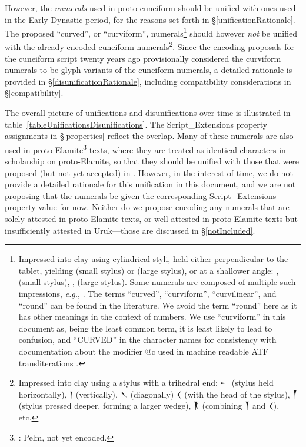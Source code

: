 \documentclass[10pt, a4paper, twoside]{article}
\newcommand\oneAšC{{\proposalfont\symbol{"12550}}} %
\newcommand\oneDišC{{\proposalfont\symbol{"12559}}}
\newcommand\oneUC{{\proposalfont\symbol{"12562}}}
\newcommand\oneŊešTwoC{{\proposalfont\symbol{"1256B}}}
\newcommand\oneŊešʾuC{{\proposalfont\symbol{"12574}}}
\newcommand\oneŠarTwoC{{\proposalfont\symbol{"12579}}}
\newcommand\oneŠarʾuC{{\proposalfont\symbol{"12582}}}
\newcommand\oneNThirtyNineA{{\proposalfont\symbol{"125B6}}}
\newcommand{\exempligratia}{\emph{e.g.}}
\begin{document}
However, the \emph{numerals} used in proto-cuneiform should be unified with
ones used in the Early Dynastic period, for the reasons set forth in
§\ref{unificationRationale}.
The proposed ``curved'', or ``curviform'', numerals\footnote{%
Impressed into clay using cylindrical styli,
held either perpendicular to the tablet, yielding
\oneUC{} (small stylus) or
\oneŠarTwoC{} (large stylus),
or at a shallower angle:
\oneAšC, \oneDišC{} (small stylus),
\oneŊešTwoC{}, \oneNThirtyNineA{} (large stylus).
Some numerals are composed of multiple such impressions,
\exempligratia, \oneŊešʾuC.
The terms ``curved'', ``curviform'', ``curvilinear'', and ``round''
can be found in the literature.
We avoid the term ``round'' here as it has other meanings
in the context of numbers.
We use ``curviform'' in this document as, being the least
common term, it is least likely to lead to confusion,
and ``CURVED'' in the character names for consistency
with documentation about the modifier @c used in machine
readable ATF transliterations \cite{inlineATF}.}
should however \emph{not} be unified with
the already-encoded cuneiform numerals\footnote{%
Impressed into clay using a stylus with a trihedral end:
{\xsuxfont 𒀸} (stylus held horizontally),
{\xsuxfont 𒁹} (vertically),
{\xsuxfont 𒀹} (diagonally)
{\xsuxfont 𒌋} (with the head of the stylus),
{\xsuxfont 𒐕} (stylus pressed deeper, forming a larger wedge),
{\xsuxfont 𒐞} (combining {\xsuxfont 𒐕} and {\xsuxfont 𒌋}), etc.}.
Since the encoding proposals for the cuneiform script
twenty years ago provisionally considered the curviform numerals
to be glyph variants of the cuneiform numerals,
a detailed rationale is provided in §\ref{disunificationRationale},
including compatibility considerations in §\ref{compatibility}.

The overall picture of unifications and disunifications over time is illustrated in table~\ref{tableUnificationsDisunifications}.
The Script\_Extensions property assignments in §\ref{properties} reflect the overlap.
Many of these numerals are also used in proto-Elamite\footnote{\cite{ISO15924}: Pelm, not yet encoded.} texts,
where they are treated as identical characters in scholarship on proto-Elamite,
so that they should be unified with those that were proposed (but not yet accepted) in \cite{L2/23-196}.
However, in the interest of time, we do not provide a detailed rationale for this unification in this document,
and we are not proposing that the numerals be given the corresponding Script\_Extensions property value for now.
Neither do we propose encoding any numerals that are solely attested in proto-Elamite texts,
or well-attested in proto-Elamite texts but insufficiently attested in Uruk---those are discussed in §\ref{notIncluded}.
\end{document}
